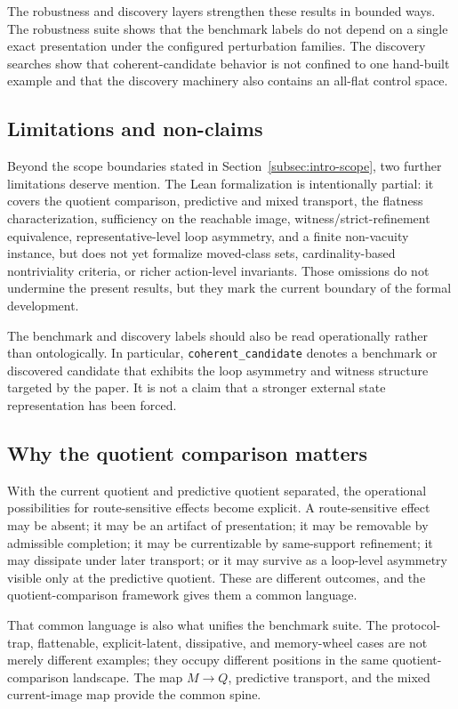\documentclass[11pt]{article}
\newcommand{\CurrentQ}{Q}
\newcommand{\PredictiveQ}{M}
\theoremstyle{definition}
\begin{document}
The robustness and discovery layers strengthen these results in bounded ways. The robustness suite shows that the benchmark labels do not depend on a single exact presentation under the configured perturbation families. The discovery searches show that coherent-candidate behavior is not confined to one hand-built example and that the discovery machinery also contains an all-flat control space.

\subsection{Limitations and non-claims}\label{subsec:discussion-limitations}
Beyond the scope boundaries stated in Section~\ref{subsec:intro-scope}, two further limitations deserve mention. The Lean formalization is intentionally partial: it covers the quotient comparison, predictive and mixed transport, the flatness characterization, sufficiency on the reachable image, witness/strict-refinement equivalence, representative-level loop asymmetry, and a finite non-vacuity instance, but does not yet formalize moved-class sets, cardinality-based nontriviality criteria, or richer action-level invariants. Those omissions do not undermine the present results, but they mark the current boundary of the formal development.

The benchmark and discovery labels should also be read operationally rather than ontologically. In particular, \texttt{coherent\_candidate} denotes a benchmark or discovered candidate that exhibits the loop asymmetry and witness structure targeted by the paper. It is not a claim that a stronger external state representation has been forced.

\subsection{Why the quotient comparison matters}\label{subsec:discussion-why}
With the current quotient and predictive quotient separated, the operational possibilities for route-sensitive effects become explicit. A route-sensitive effect may be absent; it may be an artifact of presentation; it may be removable by admissible completion; it may be currentizable by same-support refinement; it may dissipate under later transport; or it may survive as a loop-level asymmetry visible only at the predictive quotient. These are different outcomes, and the quotient-comparison framework gives them a common language.

That common language is also what unifies the benchmark suite. The protocol-trap, flattenable, explicit-latent, dissipative, and memory-wheel cases are not merely different examples; they occupy different positions in the same quotient-comparison landscape. The map $\PredictiveQ \to \CurrentQ$, predictive transport, and the mixed current-image map provide the common spine.
\end{document}
